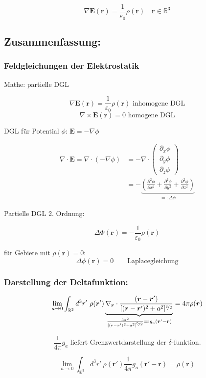 \documentclass[titlepage,11pt,a4paper,ngerman]{report}
\renewcommand{\Phi}{\varPhi}
\renewcommand{\vec}[1]{\boldsymbol{#1}}
\renewcommand{\epsilon}{\varepsilon}
\renewcommand{\paragraph}[1]{\subsubsection{#1}}
\newcommand{\frbox}[2]{\begin{tcolorbox}[colback=white,colframe=red!75!black,fonttitle=\bfseries,title=#1]#2\end{tcolorbox}}
\newcommand{\rbox}[1]{\begin{tcolorbox}[colback=white,colframe=red!75!black]#1\end{tcolorbox}}
\begin{document}
\rbox{$$\nabla \vec{E}(\vec{r}) = \frac{1}{\epsilon_0} \rho(\vec{r}) \quad \vec{r} \in \mathbb R^3$$}

\subsection{Zusammenfassung:}

\paragraph{Feldgleichungen der Elektrostatik}
Mathe: partielle DGL
\rbox{$$\nabla \vec{E}(\vec{r}) = \frac{1}{\epsilon_0} \rho(\vec{r}) \textrm{ inhomogene DGL}$$ 
	$$\nabla \times \vec{E}(\vec{r}) = 0\textrm{ homogene DGL}$$}
DGL für Potential $\phi$: 
$\vec{E} = - \nabla \phi$

\begin{align*}\nabla \cdot \vec{E} = \nabla \cdot (- \nabla \phi) &= - \nabla \cdot \begin{pmatrix} 
\partial_x \phi \\
\partial_y \phi \\ 
\partial_z \phi 
\end{pmatrix} \\
&= - \underbrace{\left( \frac{\partial^2 \phi}{\partial x^2} + \frac{\partial^2 \phi}{\partial y^2} + \frac{\partial^2 \phi}{\partial  z^2} \right) }_{=: \Delta \phi}\end{align*}

Partielle DGL 2. Ordnung:
\frbox{Poissongleichung}{$$\Delta \Phi(\vec{r}) = - \frac{1}{\epsilon_0} \rho(\vec{r})$$}

für Gebiete mit $\rho (\vec{r}) = 0$:
$$\Delta \phi (\vec{r}) = 0 \qquad \textrm{Laplacegleichung}$$

\paragraph{Darstellung der Deltafunktion:}

$$\lim_{a \to 0} \int_{\mathbb{R}^3} d^3r'\ \rho(\vec{r}')\underbrace{\nabla_{\vec{r}} \cdot \frac{(\vec{r} - \vec{r}')}{[(\vec{r} - \vec{r}')^2 + a^2]^{\nicefrac{3}{2}}}}_{\frac{3 a^2}{[(\vec{r} - \vec{r}')^2 + a^2]^{\nicefrac{5}{2}}} =: g_a(\vec{r}' - \vec{r})} = 4 \pi \rho(\vec{r})$$

$$\frac{1}{4 \pi} g_a \textrm{ liefert Grenzwertdarstellung der $\delta$-funktion.}$$

$$\lim_{a\to 0} \int_{\mathbb{R}^3} d^3r'\ \rho(\vec{r}') \frac{1}{4\pi}g_a(\vec{r}'-\vec{r})=\rho(\vec{r})$$
\end{document}
